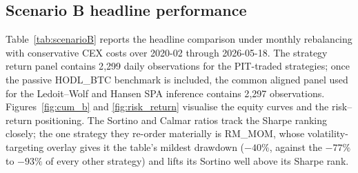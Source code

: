 \documentclass[11pt,a4paper]{article}
\begin{document}
\subsection{Scenario B headline performance}

Table~\ref{tab:scenarioB} reports the headline comparison under
monthly rebalancing with conservative CEX costs over 2020-02
through 2026-05-18. The strategy return panel contains 2{,}299 daily
observations for the PIT-traded strategies; once the passive
HODL\_BTC benchmark is included, the common aligned panel used for the
Ledoit--Wolf and Hansen SPA inference contains 2{,}297 observations.
Figures~\ref{fig:cum_b} and \ref{fig:risk_return}
visualise the equity curves and the risk--return positioning. The
Sortino and Calmar ratios track the Sharpe ranking closely; the one
strategy they re-order materially is RM\_MOM, whose volatility-targeting
overlay gives it the table's mildest drawdown ($-40\%$, against the
$-77\%$ to $-93\%$ of every other strategy) and lifts its Sortino well
above its Sharpe rank.
\end{document}
